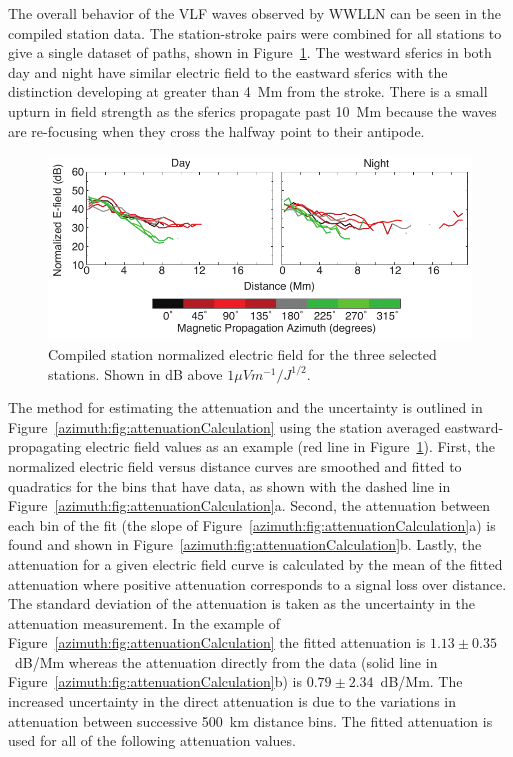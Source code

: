 The overall behavior of the VLF waves observed by WWLLN can be seen in the compiled station data.
The station-stroke pairs were combined for all stations to give a single dataset of paths, shown in Figure~\ref{azimuth:fig:azimuthAverage}.
The westward sferics in both day and night have similar electric field to the eastward sferics with the distinction developing at greater than 4~Mm from the stroke.
There is a small upturn in field strength as the sferics propagate past 10~Mm because the waves are re-focusing when they cross the halfway point to their antipode.

\begin{figure}[h!t]
    \centering
    \includegraphics[scale=1]{Azimuth/Figures/azimuthAverage.pdf} 
    \caption{Compiled station normalized electric field for the three selected stations.
    	Shown in dB above $1 \mu Vm^{-1}/J^{1/2}$.}
    \label{azimuth:fig:azimuthAverage}
 \end{figure}

The method for estimating the attenuation and the uncertainty is outlined in Figure~\ref{azimuth:fig:attenuationCalculation} using the station averaged eastward-propagating electric field values as an example (red line in Figure~\ref{azimuth:fig:azimuthAverage}).
First, the normalized electric field versus distance curves are smoothed and fitted to quadratics for the bins that have data, as shown with the dashed line in Figure~\ref{azimuth:fig:attenuationCalculation}a.
Second, the attenuation between each bin of the fit (the slope of Figure~\ref{azimuth:fig:attenuationCalculation}a) is found and shown in Figure~\ref{azimuth:fig:attenuationCalculation}b.
Lastly, the attenuation for a given electric field curve is calculated by the mean of the fitted attenuation where positive attenuation corresponds to a signal loss over distance.
The standard deviation of the attenuation is taken as the uncertainty in the attenuation measurement.
In the example of Figure~\ref{azimuth:fig:attenuationCalculation} the fitted attenuation is $1.13\pm0.35$~dB/Mm whereas the attenuation directly from the data (solid line in Figure~\ref{azimuth:fig:attenuationCalculation}b) is $0.79\pm2.34$~dB/Mm.
The increased uncertainty in the direct attenuation is due to the variations in attenuation between successive 500~km distance bins.
The fitted attenuation is used for all of the following attenuation values.


